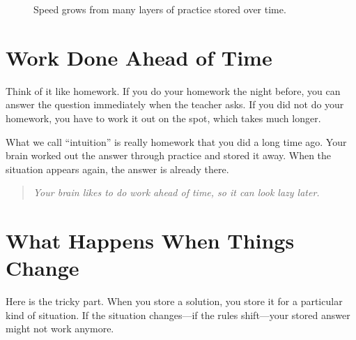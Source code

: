 \documentclass[12pt]{book}
\begin{document}
\begin{figure}[h!]
\centering
{}
\caption{Speed grows from many layers of practice stored over time.}
\end{figure}

\section{Work Done Ahead of Time}

Think of it like homework. If you do your homework the night before, you
can answer the question immediately when the teacher asks. If you did not
do your homework, you have to work it out on the spot, which takes much
longer.

What we call ``intuition'' is really homework that you did a long time ago.
Your brain worked out the answer through practice and stored it away. When
the situation appears again, the answer is already there.

\begin{quote}\itshape
Your brain likes to do work ahead of time,
so it can look lazy later.
\end{quote}

\section{What Happens When Things Change}

Here is the tricky part. When you store a solution, you store it for a
particular kind of situation. If the situation changes---if the rules
shift---your stored answer might not work anymore.
\end{document}
